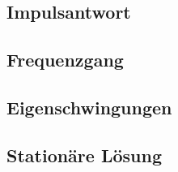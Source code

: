 \subsection{Impulsantwort}
\subsection{Frequenzgang}
\subsection{Eigenschwingungen}
\subsection{Station\"are L\"osung}

